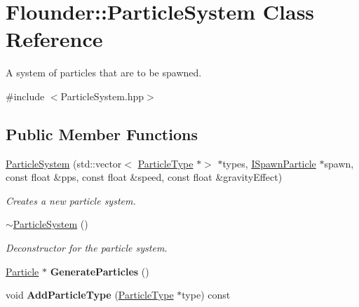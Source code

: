 \hypertarget{class_flounder_1_1_particle_system}{}\section{Flounder\+:\+:Particle\+System Class Reference}
\label{class_flounder_1_1_particle_system}


A system of particles that are to be spawned.  




{\ttfamily \#include $<$Particle\+System.\+hpp$>$}

\subsection*{Public Member Functions}
\begin{DoxyCompactItemize}
\item 
\hyperlink{class_flounder_1_1_particle_system_ac22167bc60b6a566fc5ff35bb960e099}{Particle\+System} (std\+::vector$<$ \hyperlink{class_flounder_1_1_particle_type}{Particle\+Type} $\ast$$>$ $\ast$types, \hyperlink{class_flounder_1_1_i_spawn_particle}{I\+Spawn\+Particle} $\ast$spawn, const float \&pps, const float \&speed, const float \&gravity\+Effect)
\begin{DoxyCompactList}\small\item\em Creates a new particle system. \end{DoxyCompactList}\item 
\hyperlink{class_flounder_1_1_particle_system_a4b821954c0508cd661f1fb48ebac96df}{$\sim$\+Particle\+System} ()
\begin{DoxyCompactList}\small\item\em Deconstructor for the particle system. \end{DoxyCompactList}\item 
\mbox{\label{class_flounder_1_1_particle_system_a4f6367e6b1967bb85578315431e2ed8a}} 
\hyperlink{class_flounder_1_1_particle}{Particle} $\ast$ {\bfseries Generate\+Particles} ()
\item 
\mbox{\label{class_flounder_1_1_particle_system_a68b41d79d611368ed1d1a9c7af7bb501}} 
void {\bfseries Add\+Particle\+Type} (\hyperlink{class_flounder_1_1_particle_type}{Particle\+Type} $\ast$type) const
\item 
\mbox{\label{class_flounder_1_1_particle_system_ac434a1d53403be7c10bd32a588bc5cda}} 
$$
\end{DoxyCompactItemize}
